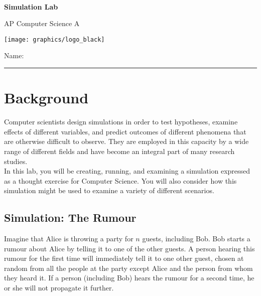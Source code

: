

\def\LabCourse{AP Computer Science A}
\def\LabNumber{02}
\def\LabTitle{Simulation Lab}


	\begin{coverpages}
		\ \\[2cm]
		\begin{center}
			\huge
			\textbf{\LabTitle}

			\Large
			\LabCourse
		\end{center}

		\vspace{1.5cm}

		\begin{center}
			\texttt{[image: graphics/logo\_black]}

			\vspace{2.5cm}

			\Large
			Name: \rule{11.5cm}{0.1pt}
		\end{center}
	\end{coverpages}

	\blankpage

	\thispagestyle{empty}
	\tableofcontents

	\pagebreak

	\section{Background}
		Computer scientists design simulations in order to test hypotheses, examine effects of different variables, and predict outcomes of different phenomena that are otherwise difficult to observe. They are employed in this capacity by a wide range of different fields and have become an integral part of many research studies.\\[\baselineskip]
	  In this lab, you will be creating, running, and examining a simulation expressed as a thought exercise for Computer Science. You will also consider how this simulation might be used to examine a variety of different scenarios.

	  \subsection{Simulation: The Rumour}
		  Imagine that Alice is throwing a party for $n$ guests, including Bob. Bob starts a rumour about Alice by telling it to one of the other guests. A person hearing this rumour for the first time will immediately tell it to one other guest, chosen at random from all the people at the party except Alice and the person from whom they heard it. If a person (including Bob) hears the rumour for a second time, he or she will not propagate it further.

